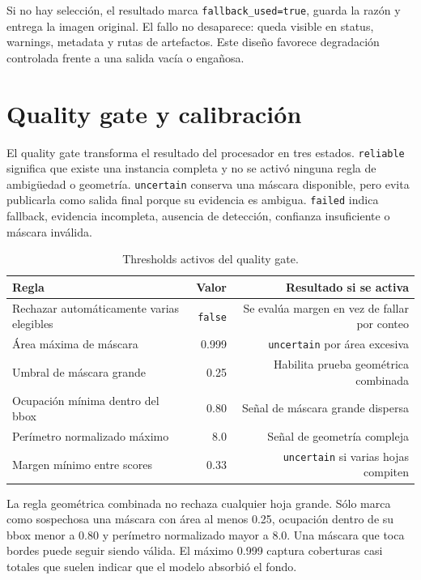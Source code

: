\documentclass[11pt,a4paper]{article}
\begin{document}
Si no hay selección, el resultado marca \texttt{fallback\_used=true}, guarda la razón y entrega la imagen original. El fallo no desaparece: queda visible en status, warnings, metadata y rutas de artefactos. Este diseño favorece degradación controlada frente a una salida vacía o engañosa.


\section{Quality gate y calibración}

El quality gate transforma el resultado del procesador en tres estados. \texttt{reliable} significa que existe una instancia completa y no se activó ninguna regla de ambigüedad o geometría. \texttt{uncertain} conserva una máscara disponible, pero evita publicarla como salida final porque su evidencia es ambigua. \texttt{failed} indica fallback, evidencia incompleta, ausencia de detección, confianza insuficiente o máscara inválida.


\begin{table}[H]
\centering
\caption{Thresholds activos del quality gate.}
\small
\begin{tabular}{lrr}
\toprule
Regla & Valor & Resultado si se activa \\
\midrule
Rechazar automáticamente varias elegibles & \texttt{false} & Se evalúa margen en vez de fallar por conteo \\
Área máxima de máscara & 0.999 & \texttt{uncertain} por área excesiva \\
Umbral de máscara grande & 0.25 & Habilita prueba geométrica combinada \\
Ocupación mínima dentro del bbox & 0.80 & Señal de máscara grande dispersa \\
Perímetro normalizado máximo & 8.0 & Señal de geometría compleja \\
Margen mínimo entre scores & 0.33 & \texttt{uncertain} si varias hojas compiten \\
\bottomrule
\end{tabular}
\end{table}

La regla geométrica combinada no rechaza cualquier hoja grande. Sólo marca como sospechosa una máscara con área al menos 0.25, ocupación dentro de su bbox menor a 0.80 y perímetro normalizado mayor a 8.0. Una máscara que toca bordes puede seguir siendo válida. El máximo 0.999 captura coberturas casi totales que suelen indicar que el modelo absorbió el fondo.
\end{document}
